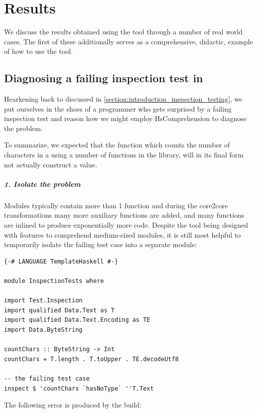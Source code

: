 \chapter{Results}

We discuss the results obtained using the tool through a number of real world cases.
The first of these additionally serves as a comprehensive, didactic, example of how to use the tool. 

\section{Diagnosing a failing inspection test in }

Hearkening back to  discussed in \cref{section:introduction_inspection_testing}, we put
ourselves in the shoes of a programmer who gets surprised by a failing inspection test and reason how we might
employ HsComprehension to diagnose the problem. 

To summarize, we expected that the function  which counts the number of characters in a 
using a number of functions in the  library, will in its final form not actually construct a  value.

\paragraph{1. Isolate the problem}
Modules typically contain more than 1 function and during the core2core transformations many more auxiliary functions are
added, and many functions are inlined to produce exponentially more code. Despite the tool being designed with features to 
comprehend medium-sized modules, it is still most helpful to temporarily isolate the
failing test case into a separate module:

\begin{verbatim}
{-# LANGUAGE TemplateHaskell #-}

module InspectionTests where

import Test.Inspection
import qualified Data.Text as T
import qualified Data.Text.Encoding as TE
import Data.ByteString

countChars :: ByteString -> Int
countChars = T.length . T.toUpper . TE.decodeUtf8

-- the failing test case
inspect $ 'countChars `hasNoType` ''T.Text
\end{verbatim}

The following error is produced by the build:

